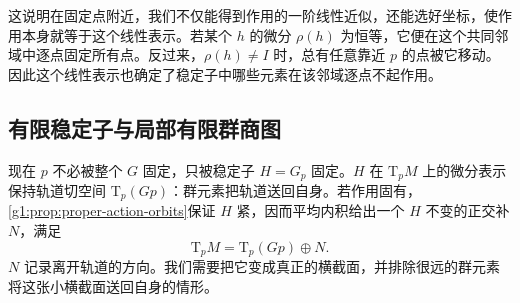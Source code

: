 这说明在固定点附近，我们不仅能得到作用的一阶线性近似，还能选好坐标，使作用本身就等于这个线性表示。若某个 \(h\) 的微分 \(\rho(h)\) 为恒等，它便在这个共同邻域中逐点固定所有点。反过来，\(\rho(h)\ne I\) 时，总有任意靠近 \(p\) 的点被它移动。因此这个线性表示也确定了稳定子中哪些元素在该邻域逐点不起作用。

\subsection{有限稳定子与局部有限群商图}
\label{g1:subsec:1704:02}

现在 \(p\) 不必被整个 \(G\) 固定，只被稳定子 \(H=G_p\) 固定。\(H\) 在 \(\mathrm{T}_pM\) 上的微分表示保持轨道切空间 \(\mathrm{T}_p(Gp)\)：群元素把轨道送回自身。若作用固有，\cref{g1:prop:proper-action-orbits}保证 \(H\) 紧，因而平均内积给出一个 \(H\) 不变的正交补 \(N\)，满足
\[
	\mathrm{T}_pM=\mathrm{T}_p(Gp)\oplus N.
\]
\(N\) 记录离开轨道的方向。我们需要把它变成真正的横截面，并排除很远的群元素将这张小横截面送回自身的情形。

